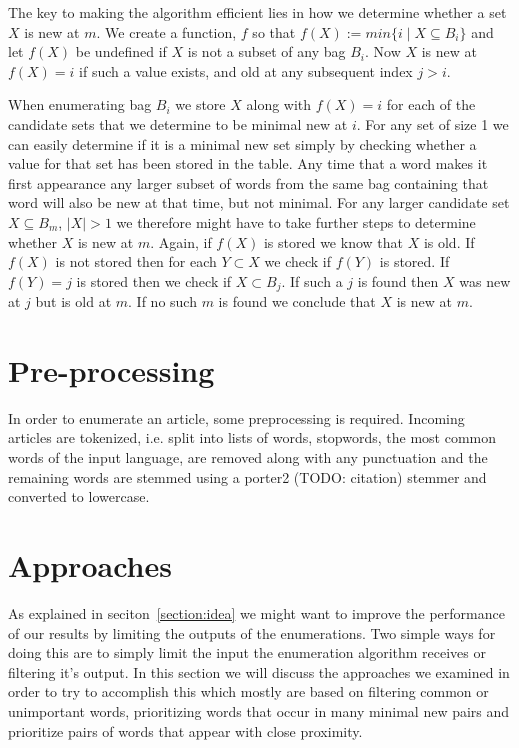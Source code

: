 The key to making the algorithm efficient lies in how we determine whether a set $X$ is new at $m$. We create a function, $f$ so that $f(X) := min\{i \mid X \subseteq B_{i}\}$ and let $f(X)$ be undefined if $X$ is not a subset of any bag $B_{i}$. Now $X$ is new at $f(X)=i$ if such a value exists, and old at any subsequent index $j>i$. 

When enumerating bag $B_{i}$ we store $X$ along with $f(X)=i$ for each of the candidate sets that we determine to be minimal new at $i$. For any set of size 1 we can easily determine if it is a minimal new set simply by checking whether a value for that set has been stored in the table.  Any time that a word makes it first appearance any larger subset of words from the same bag containing that word will also be new at that time, but not minimal. For any larger candidate set $X \subseteq B_{m}$, $|X|>1$ we therefore might have to take further steps to determine whether $X$ is new at $m$. Again, if $f(X)$ is stored we know that $X$ is old. If $f(X)$ is not stored then for each $Y \subset X$ we check if $f(Y)$ is stored. If $f(Y)=j$ is stored then we check if $X \subset B_{j}$. If such a $j$ is found then $X$ was new at $j$ but is old at $m$. If no such $m$ is found we conclude that $X$ is new at $m$.


\section{Pre-processing}
In order to enumerate an article, some preprocessing is required. Incoming articles are tokenized, i.e. split into lists of words, stopwords, the most common words of the input language, are removed along with any punctuation and the remaining words are stemmed using a porter2 (TODO: citation) stemmer and converted to lowercase.

\section{Approaches}
As explained in seciton~\ref{section:idea} we might want to improve the performance of our results by limiting the outputs of the enumerations. Two simple ways for doing this are to simply limit the input the enumeration algorithm receives or filtering it's output.
In this section we will discuss the approaches we examined in order to try to accomplish this which mostly are based on filtering common or unimportant words, prioritizing words that occur in many minimal new pairs and prioritize pairs of words that appear with close proximity.

